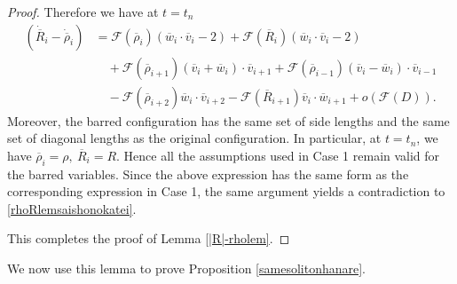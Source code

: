 \documentclass[reqno]{amsart}
\theoremstyle{plain}
\theoremstyle{definition}
\numberwithin{equation}{section}
\begin{document}
\begin{proof}
Therefore we have at $t=t_n$
\begin{align*}
\left(\dot{\overline{R}}_i-\dot{\overline{\rho}}_i\right)&=\mathcal{F}(\overline{\rho}_i)(\overline{w}_i\cdot \overline{v}_i-2)+\mathcal{F}(\overline{R}_i)(\overline{w}_i\cdot \overline{v}_i-2)
\\
&\quad +\mathcal{F}(\overline{\rho}_{i+1})(\overline{v}_i+\overline{w}_i)\cdot \overline{v}_{i+1}+\mathcal{F}(\overline{\rho}_{i-1})(\overline{v}_i-\overline{w}_i)\cdot \overline{v}_{i-1}
\\
&\quad -\mathcal{F}(\overline{\rho}_{i+2})\overline{w}_i\cdot \overline{v}_{i+2}-\mathcal{F}(\overline{R}_{i+1})\overline{v}_i\cdot \overline{w}_{i+1}+o\left(\mathcal{F}(D)\right).
\end{align*}
Moreover, the barred configuration has the same set of side lengths and the same set of diagonal lengths as the original configuration. In particular, at $t=t_n$, we have $\overline{\rho}_i=\rho,\ \overline{R}_i=R$. Hence all the assumptions used in Case 1 remain valid for the barred variables. Since the above expression has the same form as the corresponding expression in Case 1, the same argument yields a contradiction to \eqref{rhoRlemsaishonokatei}.

This completes the proof of Lemma \ref{|R|-rholem}.

\end{proof}



We now use this lemma to prove Proposition \ref{samesolitonhanare}.
\end{document}
